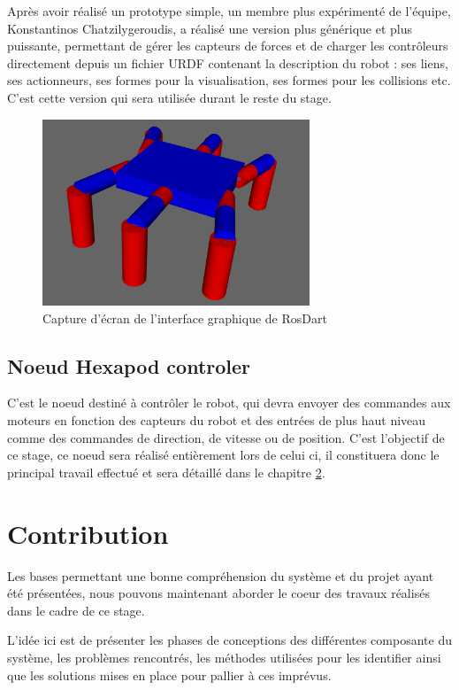 \documentclass{tnreport}
\begin{document}
Après avoir réalisé un prototype simple, un membre plus expérimenté de l'équipe, Konstantinos Chatzilygeroudis, a réalisé une version plus générique et plus puissante, permettant de gérer les capteurs de forces et de charger les contrôleurs directement depuis un fichier \gls{URDF} contenant la description du robot : ses liens, ses actionneurs, ses formes pour la visualisation, ses formes pour les collisions etc. C'est cette version qui sera utilisée durant le reste du stage.

\begin{figure}[h]
    \centering
    \includegraphics[width=8cm]{figures/rosdart}
    \caption{Capture d'écran de l'interface graphique de RosDart}
    \label{fig:rosdartgui}
\end{figure}

\section{Noeud Hexapod controler}\label{lb:controleur}
C'est le noeud destiné à contrôler le robot, qui devra envoyer des commandes aux moteurs en fonction des capteurs du robot et des entrées de plus haut niveau comme des commandes de direction, de vitesse ou de position. C'est l'objectif de ce stage, ce noeud sera réalisé entièrement lors de celui ci, il constituera donc le principal travail effectué et sera détaillé dans le chapitre \ref{lb:travail}.



\chapter{Contribution}\label{lb:travail}
Les bases permettant une bonne compréhension du système et du projet ayant été présentées, nous pouvons maintenant aborder le coeur des travaux réalisés dans le cadre de ce stage. 

L'idée ici est de présenter les phases de conceptions des différentes composante du système, les problèmes rencontrés, les méthodes utilisées pour les identifier ainsi que les solutions mises en place pour pallier à ces imprévus. 
\end{document}
